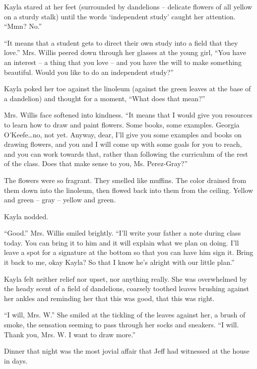 Kayla stared at her feet (surrounded by dandelions -- delicate flowers of all yellow on a sturdy stalk) until the words `independent study' caught her attention.  ``Mmn?  No.''

``It means that a student gets to direct their own study into a field that they love.''  Mrs. Willis peered down through her glasses at the young girl, ``You have an interest -- a thing that you love -- and you have the will to make something beautiful.  Would you like to do an independent study?''

Kayla poked her toe against the linoleum (against the green leaves at the base of a dandelion) and thought for a moment, ``What does that mean?''

Mrs. Willis face softened into kindness.  ``It means that I would give you resources to learn how to draw and paint flowers.  Some books, some examples.  Georgia O'Keefe\ldots{}no, not yet.  Anyway, dear, I'll give you some examples and books on drawing flowers, and you and I will come up with some goals for you to reach, and you can work towards that, rather than following the curriculum of the rest of the class.  Does that make sense to you, Ms. Perez-Gray?''

The flowers were so fragrant.  They smelled like muffins.  The color drained from them down into the linoleum, then flowed back into them from the ceiling.  Yellow and green -- gray -- yellow and green.

Kayla nodded.

``Good.''  Mrs. Willis smiled brightly.  ``I'll write your father a note during class today.  You can bring it to him and it will explain what we plan on doing.  I'll leave a spot for a signature at the bottom so that you can have him sign it.  Bring it back to me, okay Kayla?  So that I know he's alright with our little plan.''

Kayla felt neither relief nor upset, nor anything really.  She was overwhelmed by the heady scent of a field of dandelions, coarsely toothed leaves brushing against her ankles and reminding her that this was good, that this was right.

``I will, Mrs. W.''  She smiled at the tickling of the leaves against her, a brush of smoke, the sensation seeming to pass through her socks and sneakers.  ``I will.  Thank you, Mrs. W.  I want to draw more.''

\secdiv

Dinner that night was the most jovial affair that Jeff had witnessed at the house in days.

